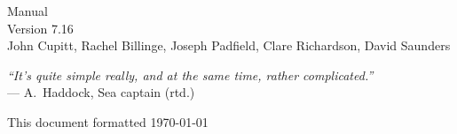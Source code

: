 \documentclass[a4paper,twocolumn,dvips]{book}
\begin{document}

\begin{titlepage}
\thispagestyle{empty}
\begin{center}
\huge
\nip{} Manual\\[0.2em]
\large Version 7.16\\
\vspace{0.5in}
\large
John Cupitt, 
Rachel Billinge,
Joseph Padfield, 
Clare Richardson, 
David Saunders\\ 
\end{center}

\vspace{3in}

\begin{center}
\noindent
\emph{``It's quite simple really, and at the same time, rather 
complicated.''} \\
--- A.\ Haddock, Sea captain (rtd.)
\end{center}

\vspace{3in}

\noindent
\small{This document formatted \today}
\setcounter{page}{1}
\end{titlepage}

\tableofcontents
\thispagestyle{plain}

\listoffigures
\thispagestyle{plain}

\listoftables
\thispagestyle{plain}

\blankpage
{}
\thispagestyle{plain}
\cfoot{}







\appendix

\end{document}
